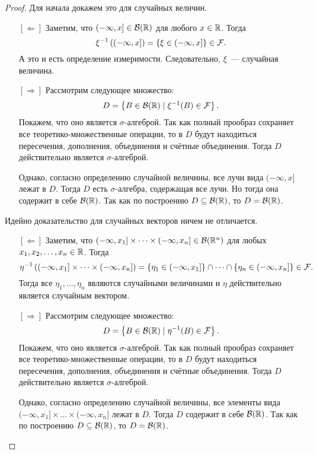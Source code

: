 \begin{proof}
	Для начала докажем это для случайных величин.
	\begin{itemize}
		\item[{\([\Leftarrow]\)}] Заметим, что \((-\infty, x] \in \mathcal{B}(\mathbb{R})\) для любого \(x \in \mathbb{R}\). Тогда 
		\[
		\xi^{-1}\left((-\infty, x]\right) = \{\xi \in (-\infty, x]\} \in \mathcal{F}.
		\]
		А это и есть определение измеримости. Следовательно, \(\xi\)~--- случайная величина.
		
		\item[{\([\Rightarrow]\)}] Рассмотрим следующее множество:
		\[
		D = \left\{B \in \mathcal{B}(\mathbb{R}) \mid \xi^{-1}(B) \in \mathcal{F}\right\}.
		\]
		Покажем, что оно является \(\sigma\)-алгеброй. Так как полный прообраз сохраняет все теоретико-множественные операции, то в \(D\) будут находиться пересечения, дополнения, объединения и счётные объединения. Тогда \(D\) действительно является \(\sigma\)-алгеброй.
		
		Однако, согласно определению случайной величины, все лучи вида \((-\infty, x]\) лежат в \(D\). Тогда \(D\) есть \(\sigma\)-алгебра, содержащая все лучи. Но тогда она содержит в себе \(\mathcal{B}(\mathbb{R})\). Так как по построению \(D \subseteq \mathcal{B}(\mathbb{R})\), то \(D = \mathcal{B}(\mathbb{R})\).
	\end{itemize}
	Идейно доказательство для случайных векторов ничем не отличается.
	\begin{itemize}
		\item[{\([\Leftarrow]\)}] Заметим, что \((-\infty, x_1] \times \dots \times (-\infty, x_n] \in \mathcal{B}(\mathbb{R}^n)\) для любых \(x_1, x_2, \dots, x_n \in \mathbb{R}\). Тогда 
		\[
		\eta^{-1}\left((-\infty, x_1] \times \dots \times (-\infty, x_n]\right) = \{\eta_1 \in (-\infty, x_1]\} \cap \dots \cap \{\eta_n \in (-\infty, x_n]\} \in \mathcal{F}.
		\]
		Тогда все \(\eta_1, \dots, \eta_n\) являются случайными величинами и \(\eta\) действительно является случайным вектором.
		
		\item[{\([\Rightarrow]\)}] Рассмотрим следующее множество:
		\[
		D = \left\{B \in \mathcal{B}(\mathbb{R}) \mid \eta^{-1}(B) \in \mathcal{F}\right\}.
		\]
		Покажем, что оно является \(\sigma\)-алгеброй. Так как полный прообраз сохраняет все теоретико-множественные операции, то в \(D\) будут находиться пересечения, дополнения, объединения и счётные объединения. Тогда \(D\) действительно является \(\sigma\)-алгеброй.
		
		Однако, согласно определению случайной величины, все элементы вида \((-\infty, x_1] \times \dots \times (-\infty, x_n]\) лежат в \(D\). Тогда \(D\) содержит в себе \(\mathcal{B}(\mathbb{R})\). Так как по построению \(D \subseteq \mathcal{B}(\mathbb{R})\), то \(D = \mathcal{B}(\mathbb{R})\).
	\end{itemize}
\end{proof}

